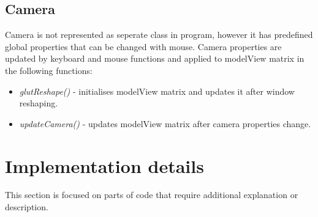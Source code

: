 \subsection{Camera}
Camera is not represented as seperate class in program, however it has predefined global properties that can be changed with mouse. Camera properties are updated by keyboard and mouse functions and applied to modelView matrix in the following functions: 
\begin{itemize} [noitemsep]
\item \emph{glutReshape()} - initialises modelView matrix and updates it after window reshaping.
\item \emph{updateCamera()} - updates modelView matrix after camera properties change.
\end{itemize}

\section{Implementation details}
This section is focused on parts of code that require additional explanation or description. 
